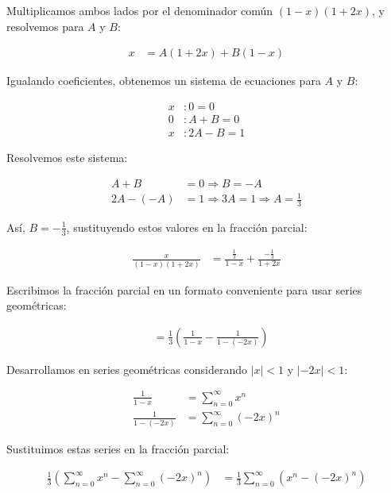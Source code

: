 \documentclass{article}
\begin{document}
    Multiplicamos ambos lados por el denominador común $(1-x)(1+2x)$, y resolvemos para $A$ y $B$:

    \begin{align*}
    x &= A(1+2x) + B(1-x)
    \end{align*}

    Igualando coeficientes, obtenemos un sistema de ecuaciones para $A$ y $B$:

    \begin{align*}
    x & : 0 = 0 \\
    0 & : A + B = 0 \\
    x & : 2A - B = 1
    \end{align*}

    Resolvemos este sistema:

    \begin{align*}
    A + B &= 0 \Rightarrow B = -A \\
    2A - (-A) &= 1 \Rightarrow 3A = 1 \Rightarrow A = \frac{1}{3}
    \end{align*}

    Así, $B = -\frac{1}{3}$, sustituyendo estos valores en la fracción parcial:

    \begin{align*}
    \frac{x}{(1-x)(1+2 x)}
    &= \frac{\frac{1}{3}}{1-x} + \frac{-\frac{1}{3}}{1+2 x}
    \end{align*}

    Escribimos la fracción parcial en un formato conveniente para usar series geométricas:

    \begin{align*}
    &= \frac{1}{3}\left(\frac{1}{1-x} - \frac{1}{1-(-2x)}\right)
    \end{align*}

    Desarrollamos en series geométricas considerando $|x| < 1$ y $|-2x| < 1$:

    \begin{align*}
    \frac{1}{1-x} &= \sum_{n=0}^{\infty} x^n \\
    \frac{1}{1-(-2x)} &= \sum_{n=0}^{\infty} (-2x)^n
    \end{align*}

    Sustituimos estas series en la fracción parcial:

    \begin{align*}
    \frac{1}{3}\left( \sum_{n=0}^{\infty} x^n - \sum_{n=0}^{\infty} (-2x)^n \right)
    &= \frac{1}{3} \sum_{n=0}^{\infty} (x^n - (-2x)^n)
    \end{align*}
\end{document}
